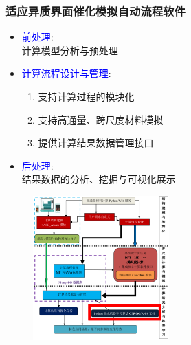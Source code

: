 \begin{frame}
	\frametitle{适应异质界面催化模拟自动流程软件}
\begin{minipage}[c]{0.42\linewidth}
\begin{itemize}
\vspace*{-2.75in}
	\item \textcolor{blue}{前处理}:\\
		计算模型分析与预处理
	\item \textcolor{blue}{计算流程设计与管理}:\\
		\begin{enumerate}
			\item 支持计算过程的模块化
			\item 支持高通量、跨尺度材料模拟
			\item 提供计算结果数据管理接口
		\end{enumerate}
	\item \textcolor{blue}{后处理}:\\
		结果数据的分析、挖掘与可视化展示
\end{itemize}
\end{minipage}
\hskip 2pt
\begin{minipage}[b]{0.47\linewidth}
\begin{figure}[h!]
\centering
\includegraphics[height=2.18in]{Figures/MP_comp_BCC.png}
\caption{\fontsize{6.5pt}{4.5pt}\selectfont{适用于异质界面的高通量材料计算自动流程软件架构}}%
\label{MP_comp_BCC}
\end{figure}
\end{minipage}
\end{frame}

